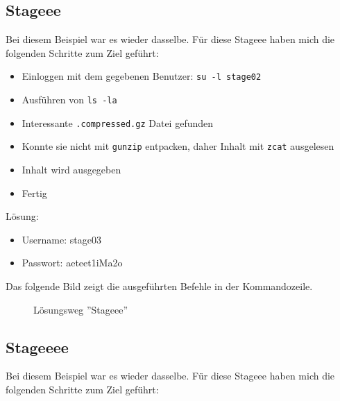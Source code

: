 \documentclass[12pt,a4paper,titlepage,oneside]{scrartcl}
\begin{document}
\subsection{Stageee}
Bei diesem Beispiel war es wieder dasselbe. Für diese Stageee haben mich die folgenden Schritte zum Ziel geführt:

\begin{itemize} 
  \item Einloggen mit dem gegebenen Benutzer: \lstinline{su -l stage02}
  \item Ausführen von \lstinline{ls -la}
  \item Interessante \lstinline{.compressed.gz} Datei gefunden
  \item Konnte sie nicht mit \lstinline{gunzip} entpacken, daher Inhalt mit \lstinline{zcat} ausgelesen
  \item Inhalt wird ausgegeben 
  \item Fertig
\end{itemize}
  
Lösung:
\begin{itemize}
  \item Username: stage03
  \item Passwort: aeteet1iMa2o  
\end{itemize}

Das folgende Bild zeigt die ausgeführten Befehle in der Kommandozeile.
  \begin{figure}[h!]
    \centering
    \caption{Lösungsweg ''Stageee''}
    \label{fig:stageee_solution}
  \end{figure}


\subsection{Stageeee}
Bei diesem Beispiel war es wieder dasselbe. Für diese Stageee haben mich die folgenden Schritte zum Ziel geführt:
\end{document}
